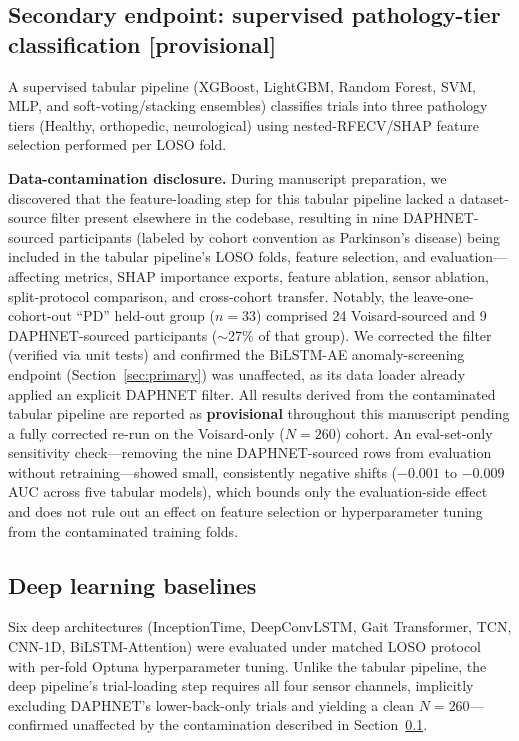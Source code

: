 \subsection{Secondary endpoint: supervised pathology-tier classification [provisional]}
\label{sec:tabular}

A supervised tabular pipeline (XGBoost, LightGBM, Random Forest, SVM, MLP, and soft-voting/stacking ensembles) classifies trials into three pathology tiers (Healthy, orthopedic, neurological) using nested-RFECV/SHAP feature selection performed per LOSO fold.

\textbf{Data-contamination disclosure.} During manuscript preparation, we discovered that the feature-loading step for this tabular pipeline lacked a dataset-source filter present elsewhere in the codebase, resulting in nine DAPHNET-sourced participants (labeled by cohort convention as Parkinson's disease) being included in the tabular pipeline's LOSO folds, feature selection, and evaluation---affecting metrics, SHAP importance exports, feature ablation, sensor ablation, split-protocol comparison, and cross-cohort transfer. Notably, the leave-one-cohort-out ``PD'' held-out group ($n=33$) comprised 24 Voisard-sourced and 9 DAPHNET-sourced participants ($\sim$27\% of that group). We corrected the filter (verified via unit tests) and confirmed the BiLSTM-AE anomaly-screening endpoint (Section~\ref{sec:primary}) was unaffected, as its data loader already applied an explicit DAPHNET filter. All results derived from the contaminated tabular pipeline are reported as \textbf{provisional} throughout this manuscript pending a fully corrected re-run on the Voisard-only ($N=260$) cohort. An eval-set-only sensitivity check---removing the nine DAPHNET-sourced rows from evaluation without retraining---showed small, consistently negative shifts ($-0.001$ to $-0.009$ AUC across five tabular models), which bounds only the evaluation-side effect and does not rule out an effect on feature selection or hyperparameter tuning from the contaminated training folds.

\subsection{Deep learning baselines}

Six deep architectures (InceptionTime, DeepConvLSTM, Gait Transformer, TCN, CNN-1D, BiLSTM-Attention) were evaluated under matched LOSO protocol with per-fold Optuna hyperparameter tuning. Unlike the tabular pipeline, the deep pipeline's trial-loading step requires all four sensor channels, implicitly excluding DAPHNET's lower-back-only trials and yielding a clean $N=260$---confirmed unaffected by the contamination described in Section~\ref{sec:tabular}.

